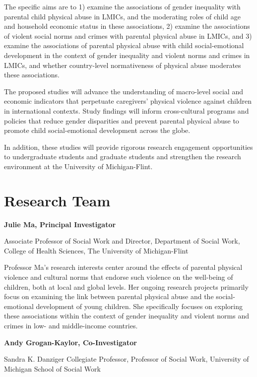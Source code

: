 \documentclass[
  letterpaper,
  DIV=11,
  numbers=noendperiod]{scrreprt}
\begin{document}
The specific aims are to 1) examine the associations of gender
inequality with parental child physical abuse in LMICs, and the
moderating roles of child age and household economic status in these
associations, 2) examine the associations of violent social norms and
crimes with parental physical abuse in LMICs, and 3) examine the
associations of parental physical abuse with child social-emotional
development in the context of gender inequality and violent norms and
crimes in LMICs, and whether country-level normativeness of physical
abuse moderates these associations.

The proposed studies will advance the understanding of macro-level
social and economic indicators that perpetuate caregivers' physical
violence against children in international contexts. Study findings will
inform cross-cultural programs and policies that reduce gender
disparities and prevent parental physical abuse to promote child
social-emotional development across the globe.

In addition, these studies will provide rigorous research engagement
opportunities to undergraduate students and graduate students and
strengthen the research environment at the University of Michigan-Flint.


\hypertarget{research-team}{%
\chapter{Research Team}\label{research-team}}

\textbf{Julie Ma, Principal Investigator}

Associate Professor of Social Work and Director, Department of Social
Work, College of Health Sciences, The University of Michigan-Flint

Professor Ma's research interests center around the effects of parental
physical violence and cultural norms that endorse such violence on the
well-being of children, both at local and global levels. Her ongoing
research projects primarily focus on examining the link between parental
physical abuse and the social-emotional development of young children.
She specifically focuses on exploring these associations within the
context of gender inequality and violent norms and crimes in low- and
middle-income countries.

\textbf{Andy Grogan-Kaylor, Co-Investigator}

Sandra K. Danziger Collegiate Professor, Professor of Social Work,
University of Michigan School of Social Work
\end{document}
